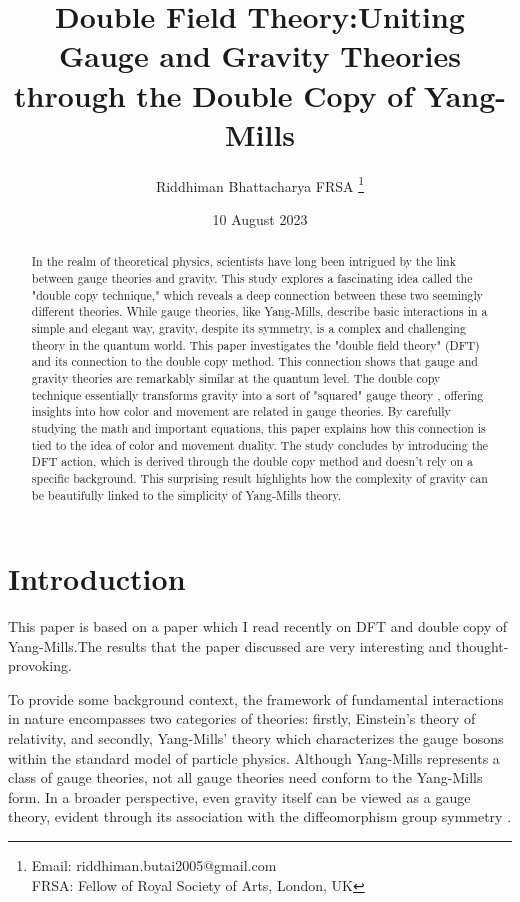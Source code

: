 \documentclass[13pt]{article}
\title{\Huge \textbf{Double Field Theory:Uniting Gauge and Gravity Theories through the Double Copy of Yang-Mills
}}
\author{Riddhiman Bhattacharya FRSA \thanks{Email: riddhiman.butai2005@gmail.com\\
FRSA: Fellow of Royal Society of Arts, London, UK}}
\date{10 August 2023}
\begin{document}
\maketitle
\large
\begin{abstract}
In the realm of theoretical physics, scientists have long been intrigued by the link between gauge theories and gravity. This study explores a fascinating idea called the "double copy technique," which reveals a deep connection between these two seemingly different theories. While gauge theories, like Yang-Mills, describe basic interactions in a simple and elegant way, gravity, despite its symmetry, is a complex and challenging theory in the quantum world. This paper investigates the "double field theory" (DFT) and its connection to the double copy method. This connection shows that gauge and gravity theories are remarkably similar at the quantum level. The double copy technique essentially transforms gravity into a sort of "squared" gauge theory \cite{Wood2021}, offering insights into how color and movement are related in gauge theories. By carefully studying the math and important equations, this paper explains how this connection is tied to the idea of color and movement duality. The study concludes by introducing the DFT action, which is derived through the double copy method and doesn't rely on a specific background. This surprising result highlights how the complexity of gravity can be beautifully linked to the simplicity of Yang-Mills theory.
\end{abstract}

\section{Introduction}

This paper is based on a paper \cite{D_az_Jaramillo_2022} which I read recently on DFT \cite{hull2009double} and double copy of Yang-Mills.The results that the paper discussed are very interesting and thought-provoking.

To provide some background context, the framework of fundamental interactions in nature encompasses two categories of theories: firstly, Einstein's theory of relativity, and secondly, Yang-Mills' theory \cite{RevModPhys.52.661, WITTEN1978394} which characterizes the gauge bosons within the standard model of particle physics. Although Yang-Mills represents a class of gauge theories, not all gauge theories need conform to the Yang-Mills form. In a broader perspective, even gravity itself can be viewed as a gauge theory, evident through its association with the diffeomorphism group symmetry \cite{Bonezzi2022}.
\end{document}
